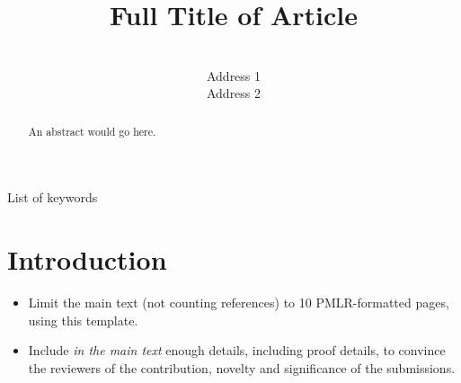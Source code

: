 \documentclass[12pt, anon]{l4dc2024}
\title[Short Title]{Full Title of Article}
\author{%
 \Name{Author Name1} \Email{abc@sample.com}\\
 \addr Address 1
 \AND
 \Name{Author Name2} \Email{xyz@sample.com}\\
 \addr Address 2%
}
\begin{document}
\maketitle

\begin{abstract}%
 An abstract would go here.%
\end{abstract}

\begin{keywords}%
  List of keywords%
\end{keywords}

\section{Introduction}

\begin{itemize}
  \item Limit the main text (not counting references) to 10 PMLR-formatted pages, using this template.
  \item Include {\em in the main text} enough details, including proof details, to convince the reviewers of the contribution, novelty and significance of the submissions.
\end{itemize}



\end{document}
